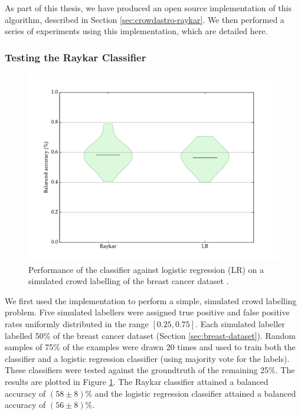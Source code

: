         As part of this thesis, we have produced an open source implementation
        of this algorithm, described in Section \ref{sec:crowdastro-raykar}. We
        then performed a series of experiments using this implementation, which
        are detailed here.

        \subsubsection{Testing the Raykar Classifier}

            \begin{figure}
                \centering
                \includegraphics[height=0.3\textheight]
                    {images/experiments/raykar.pdf}
                \caption{Performance of the \citeauthor{raykar10} classifier
                    against logistic regression (LR) on a simulated crowd
                    labelling of the breast cancer dataset \citep{wolberg90}.}
                \label{fig:raykar}
            \end{figure}

            We first used the implementation to perform a simple, simulated
            crowd labelling problem. Five simulated labellers were assigned true
            positive and false positive rates uniformly distributed in the range
            $[0.25, 0.75]$. Each simulated labeller labelled 50\% of the breast
            cancer dataset (Section \ref{sec:breast-dataset}). Random samples of
            75\% of the examples were drawn 20 times and used to train both the
            \citeauthor{raykar10} classifier and a logistic regression
            classifier (using majority vote for the labels). These classifiers
            were tested against the groundtruth of the remaining 25\%. The
            results are plotted in Figure \ref{fig:raykar}. The Raykar
            classifier attained a balanced accuracy of $(58 \pm 8)\%$ and the
            logistic regression classifier attained a balanced accuracy of $(56
            \pm 8)\%$.


